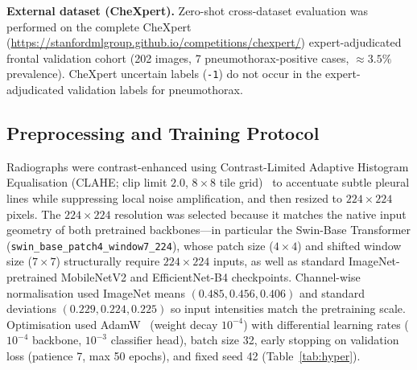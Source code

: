 \documentclass[diagnostics,article,submit,moreauthors]{Definitions/mdpi}
\newcommand{\rev}[1]{#1}
\begin{document}
\textbf{External dataset (CheXpert).} Zero-shot cross-dataset evaluation was performed on the complete CheXpert~\cite{irvin2019chexpert} (\url{https://stanfordmlgroup.github.io/competitions/chexpert/}) expert-adjudicated frontal validation cohort (202 images, 7 pneumothorax-positive cases, $\approx 3.5\%$ prevalence). CheXpert uncertain labels (\texttt{-1}) do not occur in the expert-adjudicated validation labels for pneumothorax.

\subsection{Preprocessing and Training Protocol}

\rev{Radiographs were contrast-enhanced using Contrast-Limited Adaptive Histogram Equalisation (CLAHE; clip limit $2.0$, $8\times 8$ tile grid)~\cite{zuiderveld1994contrast} to accentuate subtle pleural lines while suppressing local noise amplification, and then resized to $224\times 224$ pixels. The $224\times 224$ resolution was selected because it matches the native input geometry of both pretrained backbones---in particular the Swin-Base Transformer (\texttt{swin\_base\_patch4\_window7\_224}), whose patch size ($4\times 4$) and shifted window size ($7\times 7$) structurally require $224\times 224$ inputs, as well as standard ImageNet-pretrained MobileNetV2 and EfficientNet-B4 checkpoints.} Channel-wise normalisation used ImageNet means $(0.485, 0.456, 0.406)$ and standard deviations $(0.229, 0.224, 0.225)$ so input intensities match the pretraining scale. Optimisation used AdamW~\cite{loshchilov2019decoupled} (weight decay $10^{-4}$) with differential learning rates ($10^{-4}$ backbone, $10^{-3}$ classifier head), batch size 32, early stopping on validation loss (patience 7, max 50 epochs), and fixed seed 42 (Table~\ref{tab:hyper}).
\end{document}
